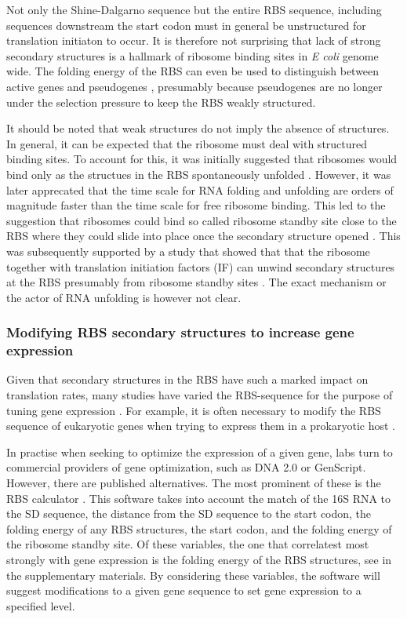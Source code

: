 Not only the Shine-Dalgarno sequence but the entire RBS sequence, including
sequences downstream the start codon \cite{seo_quantitative_2009} must in
general be unstructured for translation initiaton to occur. It is therefore not
surprising that lack of strong secondary structures is a hallmark of ribosome
binding sites in \textit{E coli} \cite{gu_universal_2010} genome wide. The
folding energy of the RBS can even be used to distinguish between active genes
and pseudogenes \cite{keller_reduced_2012}, presumably because pseudogenes are
no longer under the selection pressure to keep the RBS weakly structured.

It should be noted that weak structures do not imply the absence of structures.
In general, it can be expected that the ribosome must deal with structured
binding sites. To account for this, it was initially suggested that ribosomes
would bind only as the structues in the RBS spontaneously unfolded
\cite{de_smit_translational_1994}. However, it was later apprecated that the
time scale for RNA folding and unfolding are orders of magnitude faster than
the time scale for free ribosome binding. This led to the suggestion that
ribosomes could bind so called ribosome standby site close to the RBS where
they could slide into place once the secondary structure opened
\cite{de_smit_translational_2003-1}. This was subsequently supported by a study
that showed that that the ribosome together with translation initiation factors
(IF) can unwind secondary structures at the RBS presumably from ribosome
standby sites \cite{studer_unfolding_2006}. The exact mechanism or the actor of
RNA unfolding is however not clear.

\subsubsection{Modifying RBS secondary structures to increase gene expression}
Given that secondary structures in the RBS have such a marked impact on
translation rates, many studies have varied the RBS-sequence for the purpose of
tuning gene expression \cite{cebe_rapid_2006} \cite{park_design_2007}
\cite{berg_expression_2009}. For example, it is often necessary to modify the
RBS sequence of eukaryotic genes when trying to express them in a prokaryotic
host \cite{care_translation_2007}.

In practise when seeking to optimize the expression of a given gene, labs turn
to commercial providers of gene optimization, such as DNA 2.0 or GenScript.
However, there are published alternatives. The most prominent of these is the
RBS calculator \cite{salis_automated_2009}. This software takes into account
the match of the 16S RNA to the SD sequence, the distance from the SD sequence
to the start codon, the folding energy of any RBS structures, the start codon,
and the folding energy of the ribosome standby site. Of these variables, the
one that correlatest most strongly with gene expression is the folding energy
of the RBS structures, see \cite{salis_automated_2009} in the supplementary
materials. By considering these variables, the software will suggest
modifications to a given gene sequence to set gene expression to a specified
level.

